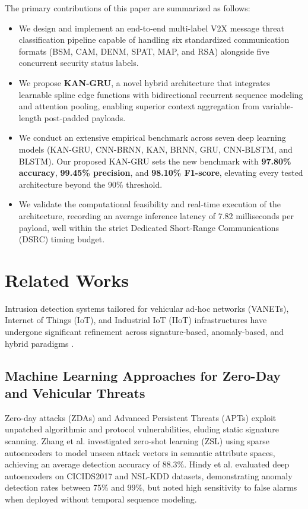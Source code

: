\documentclass[conference]{IEEEtran}
\begin{document}
The primary contributions of this paper are summarized as follows:
\begin{itemize}
    \item We design and implement an end-to-end multi-label V2X message threat classification pipeline capable of handling six standardized communication formats (BSM, CAM, DENM, SPAT, MAP, and RSA) alongside five concurrent security status labels.
    \item We propose \textbf{KAN-GRU}, a novel hybrid architecture that integrates learnable spline edge functions with bidirectional recurrent sequence modeling and attention pooling, enabling superior context aggregation from variable-length post-padded payloads.
    \item We conduct an extensive empirical benchmark across seven deep learning models (KAN-GRU, CNN-BRNN, KAN, BRNN, GRU, CNN-BLSTM, and BLSTM). Our proposed KAN-GRU sets the new benchmark with \textbf{97.80\% accuracy}, \textbf{99.45\% precision}, and \textbf{98.10\% F1-score}, elevating every tested architecture beyond the 90\% threshold.
    \item We validate the computational feasibility and real-time execution of the architecture, recording an average inference latency of 7.82 milliseconds per payload, well within the strict Dedicated Short-Range Communications (DSRC) timing budget.
\end{itemize}

\section{Related Works}
Intrusion detection systems tailored for vehicular ad-hoc networks (VANETs), Internet of Things (IoT), and Industrial IoT (IIoT) infrastructures have undergone significant refinement across signature-based, anomaly-based, and hybrid paradigms \cite{khraisat2019survey, markevych2023review}.

\subsection{Machine Learning Approaches for Zero-Day and Vehicular Threats}
Zero-day attacks (ZDAs) and Advanced Persistent Threats (APTs) exploit unpatched algorithmic and protocol vulnerabilities, eluding static signature scanning. Zhang et al. \cite{zhang2020unknown} investigated zero-shot learning (ZSL) using sparse autoencoders to model unseen attack vectors in semantic attribute spaces, achieving an average detection accuracy of 88.3\%. Hindy et al. \cite{hindy2020utilising} evaluated deep autoencoders on CICIDS2017 and NSL-KDD datasets, demonstrating anomaly detection rates between 75\% and 99\%, but noted high sensitivity to false alarms when deployed without temporal sequence modeling.
\end{document}
